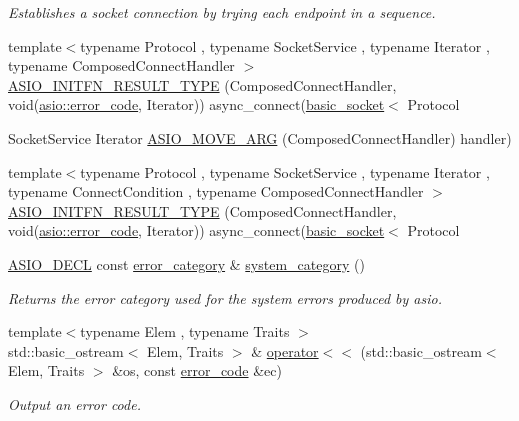 \begin{DoxyCompactItemize}
\begin{DoxyCompactList}\small\item\em Establishes a socket connection by trying each endpoint in a sequence. \end{DoxyCompactList}\item 
{\footnotesize template$<$typename Protocol , typename Socket\+Service , typename Iterator , typename Composed\+Connect\+Handler $>$ }\\\hyperlink{group__async__connect_ga7b8de8138419acd99224c0a7071a99a0}{A\+S\+I\+O\+\_\+\+I\+N\+I\+T\+F\+N\+\_\+\+R\+E\+S\+U\+L\+T\+\_\+\+T\+Y\+P\+E} (Composed\+Connect\+Handler, void(\hyperlink{classasio_1_1error__code}{asio\+::error\+\_\+code}, Iterator)) async\+\_\+connect(\hyperlink{classasio_1_1basic__socket}{basic\+\_\+socket}$<$ Protocol
\item 
Socket\+Service Iterator \hyperlink{group__async__connect_ga62bf3d82e9459cfd1fc6f51024aceb25}{A\+S\+I\+O\+\_\+\+M\+O\+V\+E\+\_\+\+A\+R\+G} (Composed\+Connect\+Handler) handler)
\item 
{\footnotesize template$<$typename Protocol , typename Socket\+Service , typename Iterator , typename Connect\+Condition , typename Composed\+Connect\+Handler $>$ }\\\hyperlink{group__async__connect_ga97861978f077050db440c518ba215350}{A\+S\+I\+O\+\_\+\+I\+N\+I\+T\+F\+N\+\_\+\+R\+E\+S\+U\+L\+T\+\_\+\+T\+Y\+P\+E} (Composed\+Connect\+Handler, void(\hyperlink{classasio_1_1error__code}{asio\+::error\+\_\+code}, Iterator)) async\+\_\+connect(\hyperlink{classasio_1_1basic__socket}{basic\+\_\+socket}$<$ Protocol
\item 
\hyperlink{config_8hpp_ab54d01ea04afeb9a8b39cfac467656b7}{A\+S\+I\+O\+\_\+\+D\+E\+C\+L} const \hyperlink{classasio_1_1error__category}{error\+\_\+category} \& \hyperlink{namespaceasio_a1776aa9a745f4da041978ce17abc44ff}{system\+\_\+category} ()
\begin{DoxyCompactList}\small\item\em Returns the error category used for the system errors produced by asio. \end{DoxyCompactList}\item 
{\footnotesize template$<$typename Elem , typename Traits $>$ }\\std\+::basic\+\_\+ostream$<$ Elem, Traits $>$ \& \hyperlink{namespaceasio_a951615f7e517dd14f0a1c3ceaa538145}{operator$<$$<$} (std\+::basic\+\_\+ostream$<$ Elem, Traits $>$ \&os, const \hyperlink{classasio_1_1error__code}{error\+\_\+code} \&ec)
\begin{DoxyCompactList}\small\item\em Output an error code. \end{DoxyCompactList}\item 

\end{DoxyCompactItemize}
